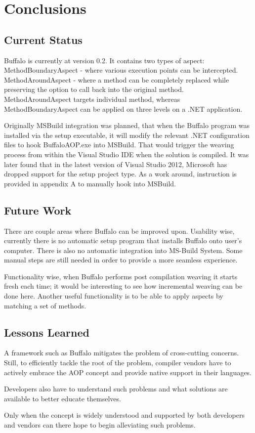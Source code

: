 \chapter{Conclusions}
\section{Current Status}

Buffalo is currently at version 0.2. It contains two types of aspect:  MethodBoundaryAspect - where various execution points can be intercepted. MethodAroundAspect - where a method can be completely replaced while preserving the option to call back into the original method. MethodAroundAspect targets individual method, whereas MethodBoundaryAspect can be applied on three levels on a .NET application.

Originally MSBuild integration was planned, that when the Buffalo program was installed via the setup executable, it will modify the relevant .NET configuration files to hook BuffaloAOP.exe into MSBuild. That would trigger the weaving process from within the Visual Studio IDE when the solution is compiled. It was later found that in the latest version of Visual Studio 2012, Microsoft has dropped support for the setup project type. As a work around, instruction is provided in appendix A to manually hook into MSBuild.

\section{Future Work}

There are couple areas where Buffalo can be improved upon. Usability wise, currently there is no automatic setup program that installs Buffalo onto user’s computer. There is also no automatic integration into MS-Build System. Some manual steps are still needed in order to provide a more seamless experience.

Functionality wise, when Buffalo performs post compilation weaving it starts fresh each time; it would be interesting to see how incremental weaving can be done here. Another useful functionality is to be able to apply aspects by matching a set of methods.

\section{Lessons Learned}

A framework such as Buffalo mitigates the problem of cross-cutting concerns. Still, to efficiently tackle the root of the problem, compiler vendors have to actively embrace the AOP concept and provide native support in their languages.

Developers also have to understand such problems and what solutions are available to better educate themselves.

Only when the concept is widely understood and supported by both developers and vendors can there hope to begin alleviating such problems.

